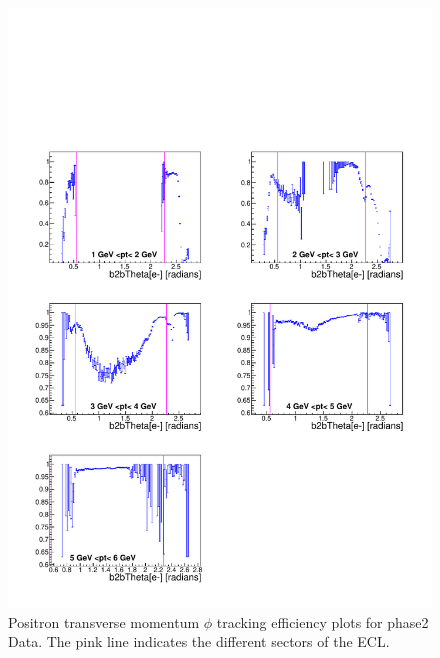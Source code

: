 \documentclass[a4paper,11pt,twosided,final,german,openbib,pdftex,listof=totoc,bibliography=totoc]{scrbook}
\begin{document}
\begin{appendix}
\begin{figure}[!htbp]
	\centering
	\includegraphics[width=\textwidth]{Plots/master/xPtMThetaep_Data}
	\caption[Transverse Momentum $\theta$ Positron Efficiency Phase2 Data]{Positron transverse momentum $\phi$ tracking efficiency plots for phase2 Data. The pink line indicates the different sectors of the ECL.}
	\label{plt:PtMThetaep_Data}
\end{figure}



\end{appendix}
\end{document}
